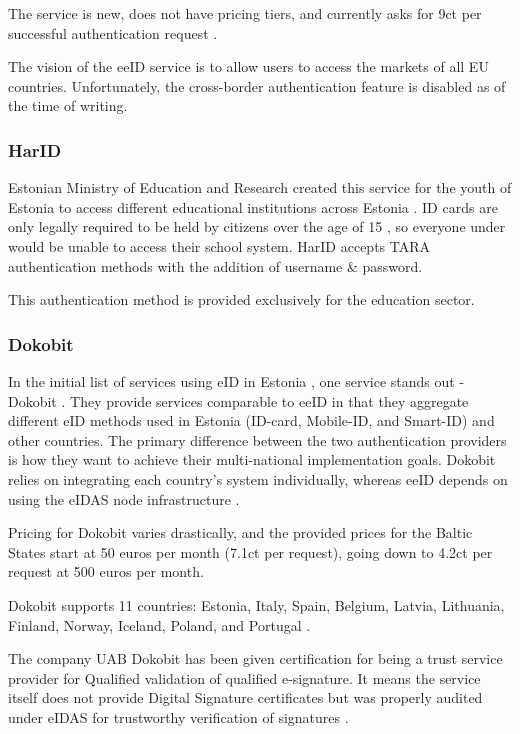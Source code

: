 The service is new, does not have pricing tiers, and currently asks for 9ct per successful authentication request \cite{eeid-pricing}.

The vision of the eeID service is to allow users to access the markets of all EU countries. Unfortunately, the cross-border authentication feature is disabled as of the time of writing.

\subsubsection{HarID}

Estonian Ministry of Education and Research created this service for the youth of Estonia to access different educational institutions across Estonia \cite{harid}. ID cards are only legally required to be held by citizens over the age of 15 \cite{eelaw-idcard}, so everyone under would be unable to access their school system. HarID accepts TARA authentication methods with the addition of {username \& password}.

This authentication method is provided exclusively for the education sector.

\subsubsection{Dokobit}

In the initial list of services using eID in Estonia \cite{ut-eidinestonia}, one service stands out - Dokobit \cite{dokobit}. They provide services comparable to eeID in that they aggregate different eID methods used in Estonia (ID-card, Mobile-ID, and Smart-ID) and other countries. The primary difference between the two authentication providers is how they want to achieve their multi-national implementation goals. Dokobit relies on integrating each country's system individually, whereas eeID depends on using the eIDAS node infrastructure \cite{eeid}.

Pricing for Dokobit varies drastically, and the provided prices for the Baltic States \cite{dokobit-pricing} start at 50 euros per month (7.1ct per request), going down to 4.2ct per request at 500 euros per month.

Dokobit supports 11 countries: Estonia, Italy, Spain, Belgium, Latvia, Lithuania, Finland, Norway, Iceland, Poland, and Portugal \cite{dokobit}.

The company UAB Dokobit has been given certification for being a trust service provider for Qualified validation of qualified e-signature. It means the service itself does not provide Digital Signature certificates but was properly audited under eIDAS for trustworthy verification of signatures \cite{eu-trustservices}.

